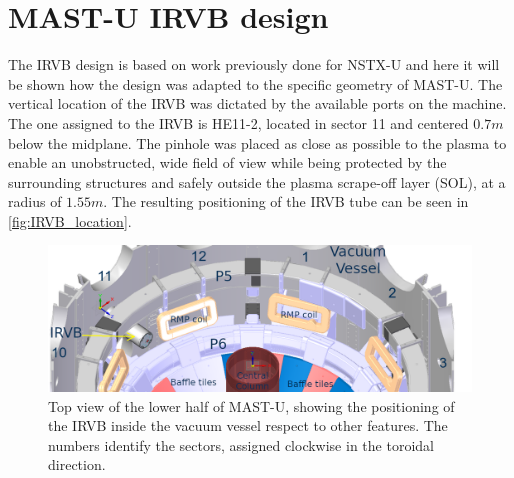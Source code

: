 \section{MAST-U IRVB design}\label{MAST-U IRVB design}
The IRVB design is based on work previously done for NSTX-U \cite{VanEden2016} and here it will be shown how the design was adapted to the specific geometry of MAST-U.
The vertical location of the IRVB was dictated by the available ports on the machine. The one assigned to the IRVB is HE11-2, located in sector 11 and centered $0.7m$ below the midplane. The pinhole was placed as close as possible to the plasma to enable an unobstructed, wide field of view while being protected by the surrounding structures and safely outside the plasma scrape-off layer (SOL), at a radius of $1.55m$. The resulting positioning of the IRVB tube can be seen in \autoref{fig:IRVB_location}. 

\begin{figure}
	\centering
	\includegraphics[trim={7 0 60 0},clip,width=0.8\linewidth]{Chapters/chapter2/figs/where_irvb2.png}
	\caption{Top view of the lower half of MAST-U, showing the positioning of the IRVB inside the vacuum vessel respect to other features. The numbers identify the sectors, assigned clockwise in the toroidal direction.}
	\label{fig:IRVB_location}
\end{figure}

